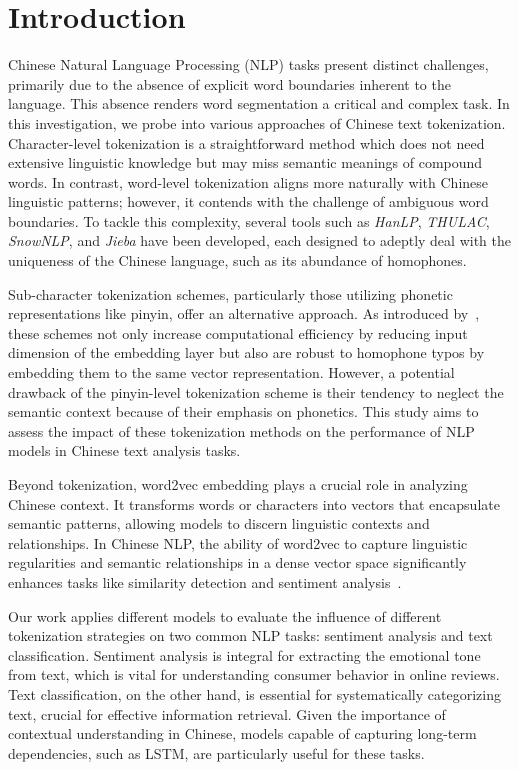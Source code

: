 \section{Introduction}
Chinese Natural Language Processing (NLP) tasks present distinct challenges, primarily due to the absence of explicit word boundaries inherent to the language. This absence renders word segmentation a critical and complex task. In this investigation, we probe into various approaches of Chinese text tokenization. Character-level tokenization is a straightforward method which does not need extensive linguistic knowledge but may miss semantic meanings of compound words. In contrast, word-level tokenization aligns more naturally with Chinese linguistic patterns; however, it contends with the challenge of ambiguous word boundaries. To tackle this complexity, several tools such as \textit{HanLP}, \textit{THULAC}, \textit{SnowNLP}, and \textit{Jieba} have been developed, each designed to adeptly deal with the uniqueness of the Chinese language, such as its abundance of homophones. 

Sub-character tokenization schemes, particularly those utilizing phonetic representations like pinyin, offer an alternative approach. As introduced by~\citep{si-etal-2023-sub}, these schemes not only increase computational efficiency by reducing input dimension of the embedding layer but also are robust to homophone typos by embedding them to the same vector representation. However, a potential drawback of the pinyin-level tokenization scheme is their tendency to neglect the semantic context because of their emphasis on phonetics. This study aims to assess the impact of these tokenization methods on the performance of NLP models in Chinese text analysis tasks.
 
Beyond tokenization, word2vec \citep{mikolov2013efficient} embedding plays a crucial role in analyzing Chinese context. It transforms words or characters into vectors that encapsulate semantic patterns, allowing models to discern linguistic contexts and relationships. In Chinese NLP, the ability of word2vec to capture linguistic regularities and semantic relationships in a dense vector space significantly enhances tasks like similarity detection and sentiment analysis~\citep{li2018ana}. 

Our work applies different models to evaluate the influence of different tokenization strategies on two common NLP tasks: sentiment analysis and text classification. Sentiment analysis is integral for extracting the emotional tone from text, which is vital for understanding consumer behavior in online reviews. Text classification, on the other hand, is essential for systematically categorizing text, crucial for effective information retrieval. Given the importance of contextual understanding in Chinese, models capable of capturing long-term dependencies, such as LSTM, are particularly useful for these tasks.

